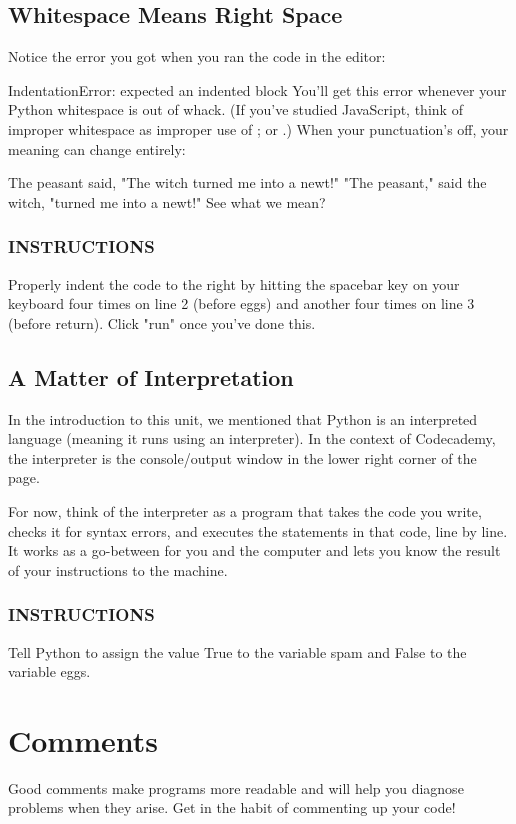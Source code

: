 \documentclass[12pt,a4paper,final,twoside,onecolumn,titlepage]{book}
\begin{document}
\subsection{Whitespace Means Right Space}
Notice the error you got when you ran the code in the editor:

IndentationError: expected an indented   block
You'll get this error whenever your Python whitespace is out of whack. (If you've studied JavaScript, think of improper whitespace as improper use of ; or {}.) When your punctuation's off, your meaning can change entirely:

The peasant said, "The witch turned me into a newt!"
"The peasant," said the witch, "turned me into a newt!"
See what we mean?

\subsubsection{INSTRUCTIONS}
Properly indent the code to the right by hitting the spacebar key on your keyboard four times on line 2 (before eggs) and another four times on line 3 (before return). Click "run" once you've done this.

\subsection{A Matter of Interpretation}
In the introduction to this unit, we mentioned that Python is an interpreted language (meaning it runs using an interpreter). In the context of Codecademy, the interpreter is the console/output window in the lower right corner of the page.

For now, think of the interpreter as a program that takes the code you write, checks it for syntax errors, and executes the statements in that code, line by line. It works as a go-between for you and the computer and lets you know the result of your instructions to the machine.

\subsubsection{INSTRUCTIONS}
Tell Python to assign the value True to the variable spam and False to the variable eggs.

\section{Comments}
Good comments make programs more readable and will help you diagnose problems when they arise. Get in the habit of commenting up your code!
\end{document}

